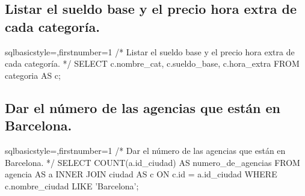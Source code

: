 	\subsection{Listar el sueldo base y el precio hora extra de cada categoría.}
		\begin{sourcecodep}[]{sql}{basicstyle={\fontsize{10}{10}\selectfont\ttfamily},firstnumber=1}{}
			/* Listar el sueldo base y el precio hora extra de cada categoría. */
			SELECT c.nombre_cat, c.sueldo_base, c.hora_extra FROM categoria AS c;\end{sourcecodep}
	\subsection{Dar el número de las agencias que están en Barcelona.}
		\begin{sourcecodep}[]{sql}{basicstyle={\fontsize{10}{10}\selectfont\ttfamily},firstnumber=1}{}
			/* Dar el número de las agencias que están en Barcelona. */
			SELECT COUNT(a.id_ciudad) AS numero_de_agencias FROM agencia AS a 
				INNER JOIN ciudad AS c ON c.id = a.id_ciudad
				WHERE c.nombre_ciudad LIKE 'Barcelona';\end{sourcecodep}

